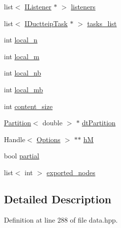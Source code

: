 \begin{DoxyCompactItemize}
\item 
list$<$ \hyperlink{class_i_listener}{IListener} $\ast$ $>$ \hyperlink{class_i_data_aa7d44f5d83938ee056221867600fd7db}{listeners}
\item 
list$<$ \hyperlink{class_i_ductteip_task}{IDuctteipTask} $\ast$ $>$ \hyperlink{class_i_data_a319a3f8f7280bab52ddea7843f5398f1}{tasks\_\-list}
\item 
int \hyperlink{class_i_data_a521517b4c122b1260851e3cec3f8e83f}{local\_\-n}
\item 
int \hyperlink{class_i_data_aff1391e4b21d315fe742aca22bfa5aed}{local\_\-m}
\item 
int \hyperlink{class_i_data_a918da97f18b81ef440a65c7cde8f3438}{local\_\-nb}
\item 
int \hyperlink{class_i_data_a3158c94ab8af22d09004ff24c3db8205}{local\_\-mb}
\item 
int \hyperlink{class_i_data_a15b74bcf67e36b559c1fdbf5192206b8}{content\_\-size}
\item 
\hyperlink{class_partition}{Partition}$<$ double $>$ $\ast$ \hyperlink{class_i_data_a97916f47cd9feed0aad32c066172536f}{dtPartition}
\item 
Handle$<$ \hyperlink{struct_options}{Options} $>$ $\ast$$\ast$ \hyperlink{class_i_data_a409bcb0fb45a8d4fadc214780ad15470}{hM}
\item 
bool \hyperlink{class_i_data_abbfc199f238d3fe16d66bbfc18e74ad4}{partial}
\item 
list$<$ int $>$ \hyperlink{class_i_data_aed01ed7d506a222e39f110b2498e4e08}{exported\_\-nodes}
\end{DoxyCompactItemize}


\subsection{Detailed Description}


Definition at line 288 of file data.hpp.

